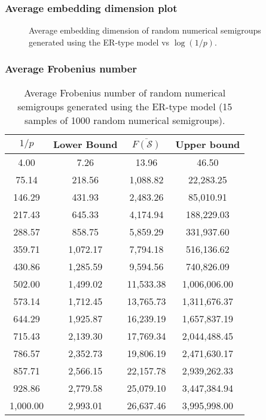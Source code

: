 \documentclass{beamer}
\begin{document}
\begin{frame}
    \frametitle{Average embedding dimension plot}
    \begin{figure}[h]
        \begin{center}
            \scalebox{0.6}{}
        \end{center}
        \caption{Average embedding dimension of random numerical semigroups generated using the ER-type model vs $\log(1/p)$.}
        \label{fig:embedding}
    \end{figure}
\end{frame}


\begin{frame}
    \fontsize{10pt}{7.2}\selectfont
    \frametitle{Average Frobenius number}
    \begin{table}
        \centering
        \begin{tabular}{|c|c|c|c|}
            \hline
            $1/p$ & Lower Bound & $\overline{F(\mathcal{S})}$ & Upper bound \\
            \hline
            4.00 & 7.26 & 13.96 & 46.50 \\
            75.14 & 218.56 & 1,088.82 & 22,283.25 \\
            146.29 & 431.93 & 2,483.26 & 85,010.91 \\
            217.43 & 645.33 & 4,174.94 & 188,229.03 \\
            288.57 & 858.75 & 5,859.29 & 331,937.60 \\
            359.71 & 1,072.17 & 7,794.18 & 516,136.62 \\
            430.86 & 1,285.59 & 9,594.56 & 740,826.09 \\
            502.00 & 1,499.02 & 11,533.38 & 1,006,006.00 \\
            573.14 & 1,712.45 & 13,765.73 & 1,311,676.37 \\
            644.29 & 1,925.87 & 16,239.19 & 1,657,837.19 \\
            715.43 & 2,139.30 & 17,769.34 & 2,044,488.45 \\
            786.57 & 2,352.73 & 19,806.19 & 2,471,630.17 \\
            857.71 & 2,566.15 & 22,157.78 & 2,939,262.33 \\
            928.86 & 2,779.58 & 25,079.10 & 3,447,384.94 \\
            1,000.00 & 2,993.01 & 26,637.46 & 3,995,998.00 \\
            \hline
        \end{tabular}
        \caption{Average Frobenius number of random numerical semigroups generated using the ER-type model (15 samples of 1000 random numerical semigroups).}
        \label{tab:frobenius}
        \end{table}
    \end{frame}
\end{document}
